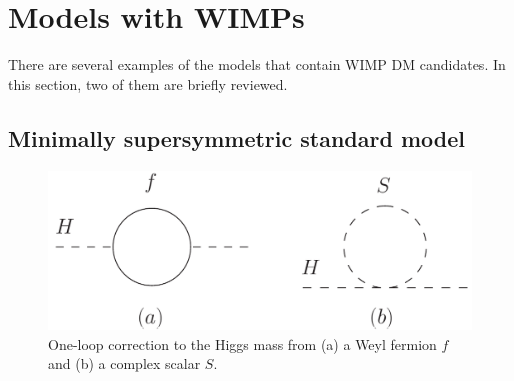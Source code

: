 \documentclass[12pt,twoside,book]{article}
\begin{document}
\section{Models with WIMPs}
\setcounter{equation}{0}

\vskip 0.1in

There are several examples of the models that contain WIMP DM
candidates.  In this section, two of them  are briefly
reviewed.  

\subsection{Minimally supersymmetric standard model}


\begin{figure}[b]
  \centering
  \includegraphics[width=0.6\hsize]{loop_correction.pdf}
  \caption{One-loop correction to the Higgs mass from (a) a Weyl fermion $f$ and (b) a complex scalar $S$.}
  \label{fig:loop_correction}
\end{figure}
\end{document}
